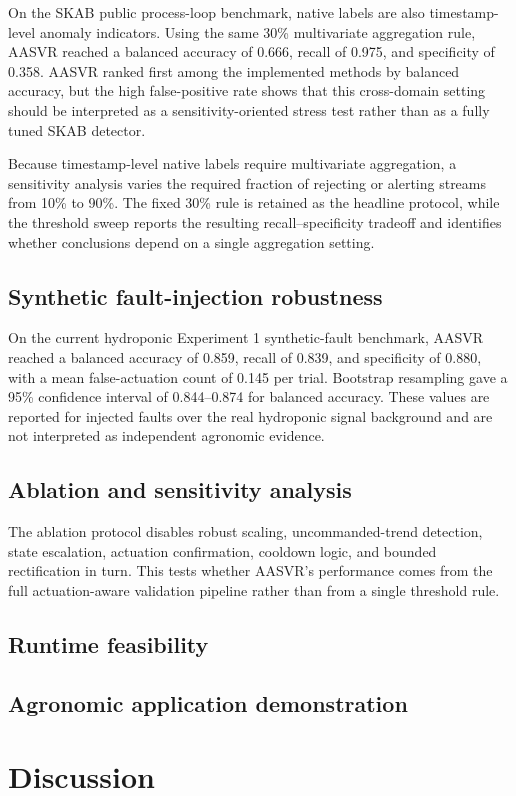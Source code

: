 \documentclass[preprint,12pt]{elsarticle}
\begin{document}
On the SKAB public process-loop benchmark, native labels are also timestamp-level anomaly indicators. Using the same 30\% multivariate aggregation rule, AASVR reached a balanced accuracy of 0.666, recall of 0.975, and specificity of 0.358. AASVR ranked first among the implemented methods by balanced accuracy, but the high false-positive rate shows that this cross-domain setting should be interpreted as a sensitivity-oriented stress test rather than as a fully tuned SKAB detector.

Because timestamp-level native labels require multivariate aggregation, a sensitivity analysis varies the required fraction of rejecting or alerting streams from 10\% to 90\%. The fixed 30\% rule is retained as the headline protocol, while the threshold sweep reports the resulting recall--specificity tradeoff and identifies whether conclusions depend on a single aggregation setting.
\subsection{Synthetic fault-injection robustness}
On the current hydroponic Experiment 1 synthetic-fault benchmark, AASVR reached a balanced accuracy of 0.859, recall of 0.839, and specificity of 0.880, with a mean false-actuation count of 0.145 per trial. Bootstrap resampling gave a 95\% confidence interval of 0.844--0.874 for balanced accuracy. These values are reported for injected faults over the real hydroponic signal background and are not interpreted as independent agronomic evidence.
\subsection{Ablation and sensitivity analysis}
The ablation protocol disables robust scaling, uncommanded-trend detection, state escalation, actuation confirmation, cooldown logic, and bounded rectification in turn. This tests whether AASVR's performance comes from the full actuation-aware validation pipeline rather than from a single threshold rule.
\subsection{Runtime feasibility}
\subsection{Agronomic application demonstration}

\section{Discussion}
\end{document}
